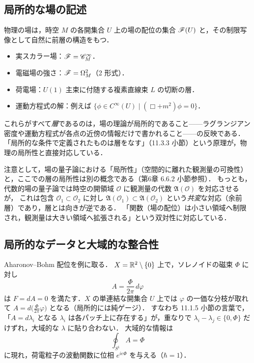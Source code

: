 \subsection{局所的な場の記述}

物理の場は，時空 $M$ の各開集合 $U$ 上の場の配位の集合 $\mathscr{F}(U)$ と，その制限写像として自然に前層の構造をもつ．
\begin{itemize}
  \item 実スカラー場：$\mathscr{F}=\mathscr{C}^\infty_M$．
  \item 電磁場の強さ：$\mathscr{F}=\Omega^2_M$（2 形式）．
  \item 荷電場：$U(1)$ 主束に付随する複素直線束 $L$ の切断の層．
  \item 運動方程式の解：例えば $\{\phi\in C^\infty(U)\mid (\Box+m^2)\phi=0\}$．
\end{itemize}
これらがすべて\emph{層}であるのは，場の理論が局所的であること——ラグランジアン密度や運動方程式が各点の近傍の情報だけで書かれること——の反映である．
「局所的な条件で定義されたものは層をなす」（11.3.3 小節）という原理が，物理の局所性と直接対応している．

注意として，場の量子論における「局所性」（空間的に離れた観測量の可換性）と，ここでの層の局所性は別の概念である（第6章 6.6.2 小節参照）．
もっとも，代数的場の量子論では時空の開領域 $\mathcal{O}$ に観測量の代数 $\mathfrak{A}(\mathcal{O})$ を対応させるが，
これは包含 $\mathcal{O}_1\subset\mathcal{O}_2$ に対し $\mathfrak{A}(\mathcal{O}_1)\subset\mathfrak{A}(\mathcal{O}_2)$ という\emph{共変}な対応（余前層）であり，層とは向きが逆である．
「関数（場の配位）は小さい領域へ制限され，観測量は大きい領域へ拡張される」という双対性に対応している．

\subsection{局所的なデータと大域的な整合性}

Aharonov--Bohm 配位を例に取る．
$X=\mathbb{R}^2\setminus\{0\}$ 上で，ソレノイドの磁束 $\Phi$ に対し
\[
  A=\frac{\Phi}{2\pi}\,d\varphi
\]
は $F=dA=0$ を満たす．$X$ の単連結な開集合 $U$ 上では $\varphi$ の一価な分枝が取れて $A=d\big(\tfrac{\Phi}{2\pi}\varphi\big)$ となる（局所的には純ゲージ）．
すなわち 11.1.5 小節の言葉で，「$A=d\lambda_i$ となる $\lambda_i$ は各パッチ上に存在する」が，重なりで $\lambda_i-\lambda_j\in\{0,\Phi\}$ だけずれ，大域的な $\lambda$ に貼り合わない．
大域的な情報は
\[
  \oint_{S^1}A = \Phi
\]
に現れ，荷電粒子の波動関数に位相 $e^{ie\Phi}$ を与える（$\hbar=1$）．

